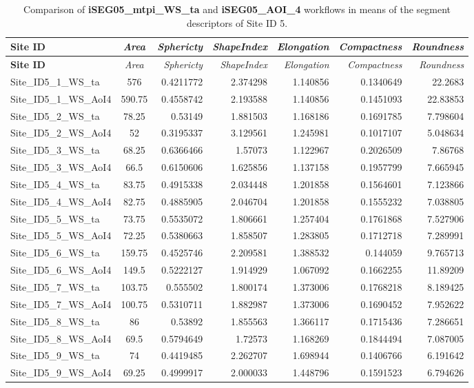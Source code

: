 \documentclass[
  12pt,
]{article}
\begin{document}
\begin{longtable}[]{@{}lcrrrrr@{}}
\caption{Comparison of \textbf{iSEG05\_mtpi\_WS\_ta} and \textbf{iSEG05\_AOI\_4} workflows in means of the segment descriptors of Site ID 5.}\tabularnewline
\toprule
\textbf{Site ID} & \emph{Area} & \emph{Sphericty} & \emph{ShapeIndex} & \emph{Elongation} & \emph{Compactness} & \emph{Roundness} \\
\midrule
\endfirsthead
\toprule
\textbf{Site ID} & \emph{Area} & \emph{Sphericty} & \emph{ShapeIndex} & \emph{Elongation} & \emph{Compactness} & \emph{Roundness} \\
\midrule
\endhead
Site\_ID5\_1\_WS\_ta & 576 & 0.4211772 & 2.374298 & 1.140856 & 0.1340649 & 22.2683 \\
Site\_ID5\_1\_WS\_AoI4 & 590.75 & 0.4558742 & 2.193588 & 1.140856 & 0.1451093 & 22.83853 \\
Site\_ID5\_2\_WS\_ta & 78.25 & 0.53149 & 1.881503 & 1.168186 & 0.1691785 & 7.798604 \\
Site\_ID5\_2\_WS\_AoI4 & 52 & 0.3195337 & 3.129561 & 1.245981 & 0.1017107 & 5.048634 \\
Site\_ID5\_3\_WS\_ta & 68.25 & 0.6366466 & 1.57073 & 1.122967 & 0.2026509 & 7.86768 \\
Site\_ID5\_3\_WS\_AoI4 & 66.5 & 0.6150606 & 1.625856 & 1.137158 & 0.1957799 & 7.665945 \\
Site\_ID5\_4\_WS\_ta & 83.75 & 0.4915338 & 2.034448 & 1.201858 & 0.1564601 & 7.123866 \\
Site\_ID5\_4\_WS\_AoI4 & 82.75 & 0.4885905 & 2.046704 & 1.201858 & 0.1555232 & 7.038805 \\
Site\_ID5\_5\_WS\_ta & 73.75 & 0.5535072 & 1.806661 & 1.257404 & 0.1761868 & 7.527906 \\
Site\_ID5\_5\_WS\_AoI4 & 72.25 & 0.5380663 & 1.858507 & 1.283805 & 0.1712718 & 7.289991 \\
Site\_ID5\_6\_WS\_ta & 159.75 & 0.4525746 & 2.209581 & 1.388532 & 0.144059 & 9.765713 \\
Site\_ID5\_6\_WS\_AoI4 & 149.5 & 0.5222127 & 1.914929 & 1.067092 & 0.1662255 & 11.89209 \\
Site\_ID5\_7\_WS\_ta & 103.75 & 0.555502 & 1.800174 & 1.373006 & 0.1768218 & 8.189425 \\
Site\_ID5\_7\_WS\_AoI4 & 100.75 & 0.5310711 & 1.882987 & 1.373006 & 0.1690452 & 7.952622 \\
Site\_ID5\_8\_WS\_ta & 86 & 0.53892 & 1.855563 & 1.366117 & 0.1715436 & 7.286651 \\
Site\_ID5\_8\_WS\_AoI4 & 69.5 & 0.5794649 & 1.72573 & 1.168269 & 0.1844494 & 7.087005 \\
Site\_ID5\_9\_WS\_ta & 74 & 0.4419485 & 2.262707 & 1.698944 & 0.1406766 & 6.191642 \\
Site\_ID5\_9\_WS\_AoI4 & 69.25 & 0.4999917 & 2.000033 & 1.448796 & 0.1591523 & 6.794626 \\
\bottomrule
\end{longtable}
\end{document}
